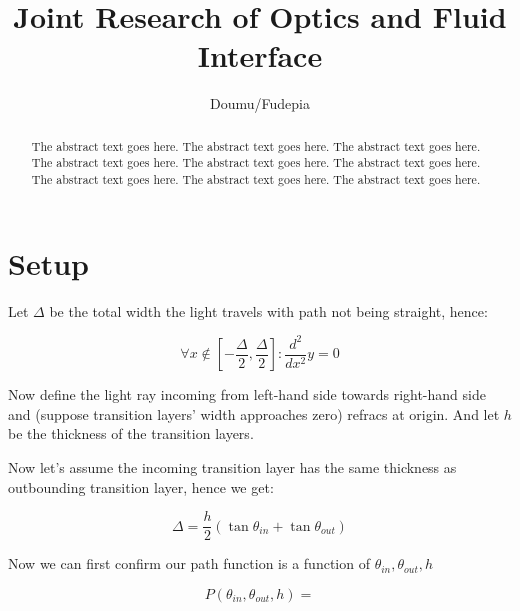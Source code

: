 \documentclass[preprint]{ptephy_v1}%
\begin{document}

\title{Joint Research of Optics and Fluid Interface}


\author{Doumu/Fudepia}

\begin{abstract}
    The abstract text goes here. The abstract text goes here. The abstract text goes here.
    The abstract text goes here. The abstract text goes here. The abstract text goes here.
    The abstract text goes here. The abstract text goes here. The abstract text goes here.
\end{abstract}



\maketitle

\section{Setup}

Let $\Delta$ be the total width the light travels with path not being straight, hence:

\begin{equation}
\forall x\notin[-\frac{\Delta}{2}, \frac{\Delta}{2}]: \frac{d^2}{dx^2}y=0
\end{equation}

Now define the light ray incoming from left-hand side towards right-hand side and (suppose transition layers' width approaches zero) refracs at origin. And let $h$ be the thickness of the transition layers.

Now let's assume the incoming transition layer has the same thickness as outbounding transition layer, hence we get:

\begin{equation}
\Delta=\frac{h}{2}(\tan\theta_{in}+\tan\theta_{out})
\end{equation}

Now we can first confirm our path function is a function of $\theta_{in}, \theta_{out}, h$

\begin{equation}
P(\theta_{in}, \theta_{out}, h)=
\end{equation}
\end{document}

